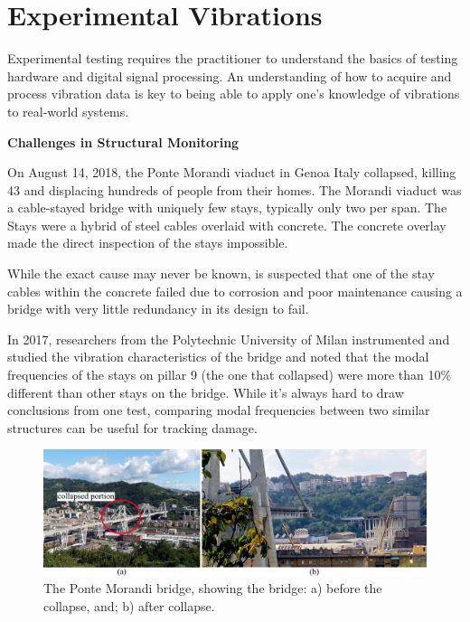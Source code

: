 \documentclass[12pt,letter]{article}
\begin{document}
	
	\setcounter{section}{6}	
	\setcounter{figure}{0}   
	\renewcommand\thefigure{\thesection.\arabic{figure}}
	\setcounter{equation}{0}   
	\renewcommand\theequation{\thesection.\arabic{equation}}

	\section{Experimental Vibrations}
	
Experimental testing requires the practitioner to understand the basics of testing hardware and digital signal processing. An understanding of how to acquire and process vibration data is key to being able to apply one's knowledge of vibrations to real-world systems.


\begin{vibration_case_study}

	\textbf{Challenges in Structural Monitoring}	

	\noindent On August 14, 2018, the Ponte Morandi viaduct in Genoa Italy collapsed, killing 43 and displacing hundreds of people from their homes. The Morandi viaduct was a cable-stayed bridge with uniquely few stays, typically only two per span. The Stays were a hybrid of steel cables overlaid with concrete. The concrete overlay made the direct inspection of the stays impossible. 
	
	While the exact cause may never be known, is suspected that one of the stay cables within the concrete failed due to corrosion and poor maintenance causing a bridge with very little redundancy in its design to fail\protect\footnotemark[1].
	
	In 2017, researchers from the Polytechnic University of Milan instrumented and studied the vibration characteristics of the bridge and noted that the modal frequencies of the stays on pillar 9 (the one that collapsed) were more than 10\% different than other stays on the bridge. While it's always hard to draw conclusions from one test, comparing modal frequencies between two similar structures can be useful for tracking damage. 
 
	\begin{figure}[H]
		\centering
		\includegraphics[width=6in]{../figures/ponte_morandi_bridge}
		\caption{The Ponte Morandi bridge, showing the bridge: a) before the collapse\protect\footnotemark[2], and; b) after collapse\protect\footnotemark[3]. }
	\end{figure}
		

\end{vibration_case_study}
\end{document}
